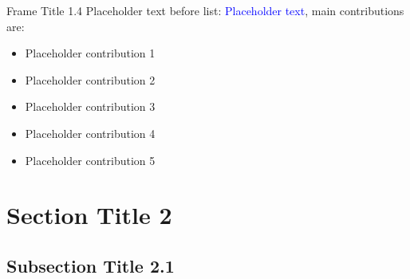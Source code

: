 \documentclass{beamer}
\begin{document}
\begin{frame}{Frame Title 1.4} %
Placeholder text before list: \textcolor{blue}{Placeholder text}, main contributions are:
    \begin{itemize}
    	\item Placeholder contribution 1
        \item Placeholder contribution 2
        \item Placeholder contribution 3
        \item Placeholder contribution 4
        \item Placeholder contribution 5
    \end{itemize}
\end{frame}

\section{Section Title 2} %
\subsection{Subsection Title 2.1} %
\end{document}
